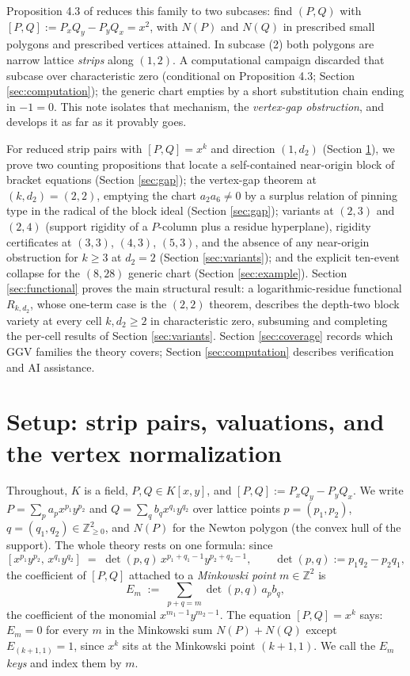 \documentclass[11pt]{article}
\theoremstyle{definition}
\theoremstyle{remark}
\begin{document}
Proposition 4.3 of \cite{GGHV} reduces this family to two subcases: find $(P,Q)$ with $[P,Q]:=P_xQ_y-P_yQ_x=x^2$, with $N(P)$ and $N(Q)$ in prescribed small polygons and prescribed vertices attained. In subcase (2) both polygons are narrow lattice \emph{strips} along $(1,2)$. A computational campaign discarded that subcase over characteristic zero (conditional on Proposition 4.3; Section \ref{sec:computation}); the generic chart empties by a short substitution chain ending in $-1=0$. This note isolates that mechanism, the \emph{vertex-gap obstruction}, and develops it as far as it provably goes.

For reduced strip pairs with $[P,Q]=x^k$ and direction $(1,d_2)$ (Section \ref{sec:setup}), we prove two counting propositions that locate a self-contained near-origin block of bracket equations (Section \ref{sec:gap}); the vertex-gap theorem at $(k,d_2)=(2,2)$, emptying the chart $a_2a_6\neq 0$ by a surplus relation of pinning type in the radical of the block ideal (Section \ref{sec:gap}); variants at $(2,3)$ and $(2,4)$ (support rigidity of a $P$-column plus a residue hyperplane), rigidity certificates at $(3,3)$, $(4,3)$, $(5,3)$, and the absence of any near-origin obstruction for $k\geq 3$ at $d_2=2$ (Section \ref{sec:variants}); and the explicit ten-event collapse for the $(8,28)$ generic chart (Section \ref{sec:example}). Section \ref{sec:functional} proves the main structural result: a logarithmic-residue functional $R_{k,d_2}$, whose one-term case is the $(2,2)$ theorem, describes the depth-two block variety at every cell $k,d_2\geq 2$ in characteristic zero, subsuming and completing the per-cell results of Section \ref{sec:variants}. Section \ref{sec:coverage} records which GGV families the theory covers; Section \ref{sec:computation} describes verification and AI assistance.

\section{Setup: strip pairs, valuations, and the vertex normalization}\label{sec:setup}

Throughout, $K$ is a field, $P,Q\in K[x,y]$, and $[P,Q]:=P_xQ_y-P_yQ_x$. We write $P=\sum_p a_p x^{p_1}y^{p_2}$ and $Q=\sum_q b_q x^{q_1}y^{q_2}$ over lattice points $p=(p_1,p_2)$, $q=(q_1,q_2)\in\mathbb{Z}_{\geq 0}^2$, and $N(P)$ for the Newton polygon (the convex hull of the support). The whole theory rests on one formula: since
\[
[x^{p_1}y^{p_2},\,x^{q_1}y^{q_2}] \;=\; \det(p,q)\, x^{p_1+q_1-1}y^{p_2+q_2-1},
\qquad \det(p,q):=p_1q_2-p_2q_1,
\]
the coefficient of $[P,Q]$ attached to a \emph{Minkowski point} $m\in\mathbb{Z}^2$ is
\begin{equation}\label{eq:key}
E_m \;:=\; \sum_{p+q=m} \det(p,q)\, a_p b_q ,
\end{equation}
the coefficient of the monomial $x^{m_1-1}y^{m_2-1}$. The equation $[P,Q]=x^k$ says: $E_m=0$ for every $m$ in the Minkowski sum $N(P)+N(Q)$ except $E_{(k+1,1)}=1$, since $x^k$ sits at the Minkowski point $(k+1,1)$. We call the $E_m$ \emph{keys} and index them by $m$.
\end{document}
